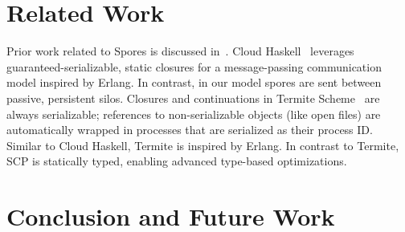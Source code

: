 \documentclass{easychair}
\begin{document}
\section{Related Work}


Prior work related to Spores is discussed in~\cite{MillerHO14}. Cloud
Haskell~\cite{CloudHaskell} leverages guaranteed-serializable, static closures
for a message-passing communication model inspired by Erlang. In contrast, in
our model spores are sent between passive, persistent silos. Closures and
continuations in Termite Scheme~\cite{Termite} are always serializable;
references to non-serializable objects (like open files) are automatically
wrapped in processes that are serialized as their process ID. Similar to Cloud
Haskell, Termite is inspired by Erlang. In contrast to Termite, SCP is statically typed,
enabling advanced type-based optimizations.



\section{Conclusion and Future Work}
\label{sec:conclusion}

%
\begin{spacing}{0.9}


\end{spacing}
\end{document}
